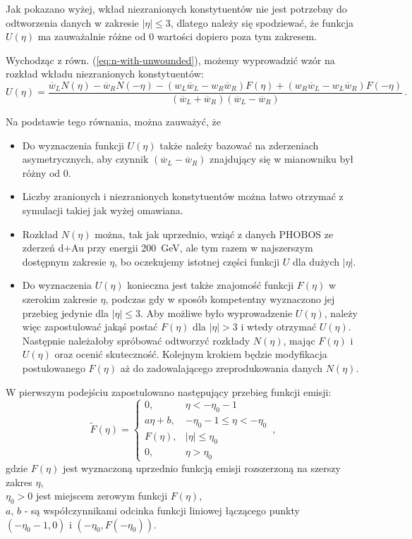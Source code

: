 \documentclass[a4paper,12pt]{article}
\begin{document}
Jak pokazano wyżej, wkład niezranionych konstytuentów nie jest potrzebny do odtworzenia danych w zakresie $|\eta| \le 3$, dlatego należy się spodziewać, że funkcja $U(\eta)$ ma zauważalnie różne od 0 wartości dopiero poza tym zakresem.

Wychodząc z równ. (\ref{eq:n-with-unwounded}), możemy wyprowadzić wzór na rozkład wkładu niezranionych konstytuentów:
\begin{equation} \label{eq:unqound-fun}
U(\eta) = \frac{\overline{w}_L N(\eta) - \overline{w}_R N(-\eta) - (w_L \overline{w}_L - w_R \overline{w}_R)F(\eta) + (w_R \overline{w}_L - w_L \overline{w}_R)F(-\eta)}{(\overline{w}_L + \overline{w}_R)(\overline{w}_L - \overline{w}_R)}\,.
\end{equation}

Na podstawie tego równania, można zauważyć, że
\begin{itemize}
	\item Do wyznaczenia funkcji $U(\eta)$ także należy bazować na zderzeniach asymetrycznych, aby czynnik $(\overline{w}_L - \overline{w}_R)$ znajdujący się w mianowniku był różny od 0.
	\item Liczby zranionych i niezranionych konstytuentów można łatwo otrzymać z symulacji takiej jak wyżej omawiana.
	\item Rozkład $N(\eta)$ można, tak jak uprzednio, wziąć z danych PHOBOS ze zderzeń d+Au przy energii 200~GeV, ale tym razem w najszerszym dostępnym zakresie $\eta$, bo oczekujemy istotnej części funkcji $U$ dla dużych $|\eta|$.
	\item Do wyznaczenia $U(\eta)$ konieczna jest także znajomość funkcji $F(\eta)$ w szerokim zakresie $\eta$, podczas gdy w sposób kompetentny wyznaczono jej przebieg jedynie dla $|\eta| \le 3$. Aby możliwe było wyprowadzenie $U(\eta)$, należy więc zapostulować jakąś postać $F(\eta)$ dla $|\eta| > 3$ i wtedy otrzymać $U(\eta)$. Następnie należałoby spróbować odtworzyć rozkłady $N(\eta)$, mając $F(\eta)$ i $U(\eta)$ oraz ocenić skuteczność. Kolejnym krokiem będzie modyfikacja postulowanego $F(\eta)$ aż do zadowalającego zreprodukowania danych $N(\eta)$.
\end{itemize}

W pierwszym podejściu zapostulowano następujący przebieg funkcji emisji:
\begin{equation}
\widetilde{F}(\eta) = 
	\begin{cases} 
		0, &\eta < -\eta_0 - 1 \\
		a\eta + b, &-\eta_0 - 1 \le \eta < -\eta_0 \\
		F(\eta), &|\eta| \le \eta_0 \\
		0, &\eta > \eta_0
	\end{cases}\,,
\end{equation}
gdzie $F(\eta)$ jest wyznaczoną uprzednio funkcją emisji rozszerzoną na szerszy zakres $\eta$,\\
$\eta_0 > 0 $ jest miejscem zerowym funkcji $F(\eta)$, \\
$a$, $b$ - są współczynnikami odcinka funkcji liniowej łączącego punkty $(-\eta_0 - 1, 0)$ i $(-\eta_0, F(-\eta_0))$.
\end{document}
